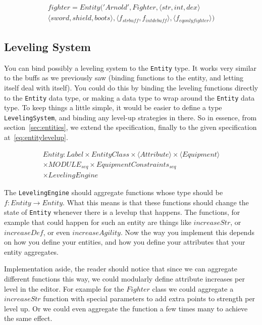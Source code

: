 \begin{equation}
\begin{split}
  \label{eq:createent}
  fighter = Entity('Arnold', Fighter, \langle str, int, dex \rangle \\
    \langle sword, shield, boots \rangle, \langle f_{strbuff}, f_{intdebuff}
  \rangle, \langle f_{eqonlyfighter} \rangle)
\end{split}
\end{equation}

\subsection{Leveling System}

You can bind possibly a leveling system to the \texttt{Entity} type. It works
very similar to the buffs as we previously saw (binding functions to the entity,
and letting itself deal with itself). You could do this by binding the leveling
functions directly to the \texttt{Entity} data type, or making a data type to
wrap around the \texttt{Entity} data type. To keep things a little simple, it
would be easier to define a type \texttt{LevelingSystem}, and binding any
level-up strategies in there. So in essence, from section~\ref{sec:entities}, we
extend the specification, finally to the given specification
at~\ref{eq:entitylevelup}.

\begin{equation}
  \begin{split}
  \label{eq:entitylevelup}
  Entity\colon Label \times
    EntityClass \times
    \langle Attribute \rangle \times
    \langle Equipment \rangle \\
    \times MODULE_{seq} \times EquipmentConstraints_{seq} \\
    \times LevelingEngine
  \end{split}
\end{equation}

The \texttt{LevelingEngine} should aggregate functions whose type should be
$f\colon Entity \to Entity$. What this means is that these functions should
change the state of \texttt{Entity} whenever there is a levelup that happens.
The functions, for example that could happen for such an entity are things like
$increaseStr$, or $increaseDef$, or even $increaseAgility$. Now the way you
implement this depends on how you define your entities, and how you define your
attributes that your entity aggregates.

Implementation aside, the reader should notice that since we can aggregate
different functions this way, we could modularly define attribute increases per
level in the editor. For example for the $Fighter$ class we could aggregate a
$increaseStr$ function with special parameters to add extra points to strength
per level up. Or we could even aggregate the function a few times many to
achieve the same effect.

